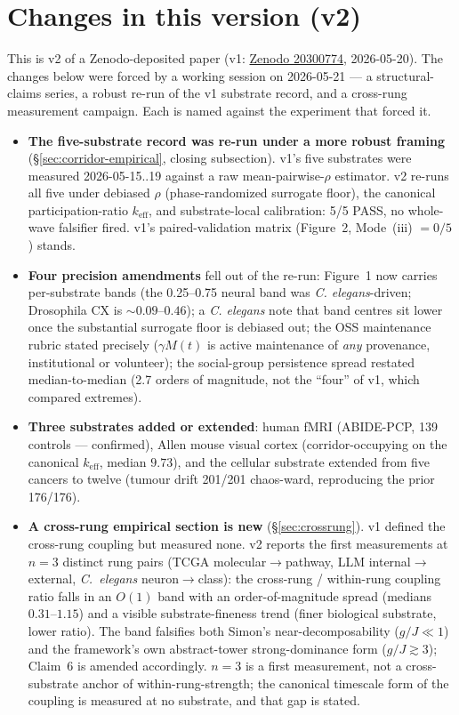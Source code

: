 \documentclass[11pt,a4paper]{article}
\newcommand{\keff}{k_{\text{eff}}}
\begin{document}
\section*{Changes in this version (v2)}

This is v2 of a Zenodo-deposited paper (v1: \href{https://zenodo.org/records/20300774}{Zenodo 20300774}, 2026-05-20). The changes below were forced by a working session on 2026-05-21 --- a structural-claims series, a robust re-run of the v1 substrate record, and a cross-rung measurement campaign. Each is named against the experiment that forced it.

\begin{itemize}[leftmargin=*,itemsep=0.5em]
\item \textbf{The five-substrate record was re-run under a more robust framing} (\S\ref{sec:corridor-empirical}, closing subsection). v1's five substrates were measured 2026-05-15..19 against a raw mean-pairwise-$\rho$ estimator. v2 re-runs all five under debiased $\rho$ (phase-randomized surrogate floor), the canonical participation-ratio $\keff$, and substrate-local calibration: 5/5 PASS, no whole-wave falsifier fired. v1's paired-validation matrix (Figure~2, Mode~(iii) $= 0/5$) stands.
\item \textbf{Four precision amendments} fell out of the re-run: Figure~1 now carries per-substrate bands (the 0.25--0.75 neural band was \emph{C. elegans}-driven; Drosophila CX is $\sim 0.09$--$0.46$); a \emph{C. elegans} note that band centres sit lower once the substantial surrogate floor is debiased out; the OSS maintenance rubric stated precisely ($\gamma M(t)$ is active maintenance of \emph{any} provenance, institutional or volunteer); the social-group persistence spread restated median-to-median (2.7 orders of magnitude, not the ``four'' of v1, which compared extremes).
\item \textbf{Three substrates added or extended}: human fMRI (ABIDE-PCP, 139 controls --- confirmed), Allen mouse visual cortex (corridor-occupying on the canonical $\keff$, median $9.73$), and the cellular substrate extended from five cancers to twelve (tumour drift 201/201 chaos-ward, reproducing the prior 176/176).
\item \textbf{A cross-rung empirical section is new} (\S\ref{sec:crossrung}). v1 defined the cross-rung coupling but measured none. v2 reports the first measurements at $n = 3$ distinct rung pairs (TCGA molecular$\to$pathway, LLM internal$\to$external, \emph{C.~elegans} neuron$\to$class): the cross-rung / within-rung coupling ratio falls in an $O(1)$ band with an order-of-magnitude spread (medians $0.31$--$1.15$) and a visible substrate-fineness trend (finer biological substrate, lower ratio). The band falsifies both Simon's near-decomposability ($g/J \ll 1$) and the framework's own abstract-tower strong-dominance form ($g/J \gtrsim 3$); Claim~6 is amended accordingly. $n = 3$ is a first measurement, not a cross-substrate anchor of within-rung-strength; the canonical timescale form of the coupling is measured at no substrate, and that gap is stated.

\end{itemize}
\end{document}
